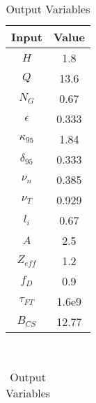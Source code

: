 \begin{table}[h!]
\centering  
\caption{Arc Variables}
\hfill
\begin{subtable}[t]{0.4\textwidth}
\centering  
\caption{Input Variables} ~\\
\begin{tabular}{ c|c } 

Input            & Value           \\
\hline
$H$              & 1.8             \\
$Q$              & 13.6            \\
$N_{G}$          & 0.67            \\
$\epsilon$       & 0.333          \\
$\kappa_{95}$    & 1.84            \\
$\delta_{95}$    & 0.333           \\
$\nu_{n}$        & 0.385           \\
$\nu_{T}$        & 0.929           \\
$l_{i}$          & 0.67            \\
$A$              & 2.5             \\
$Z_{eff}$        & 1.2             \\
$f_{D}$          & 0.9             \\
$\tau_{FT}$      & 1.6e9           \\
$B_{CS}$         & 12.77           \\

\end{tabular}
\end{subtable}
\hfill
\begin{subtable}[t]{0.5\textwidth}
\centering  
\caption{Output Variables} ~\\
\begin{tabular}{ c|c|c } 


\end{tabular}
\end{subtable}
\end{table}
